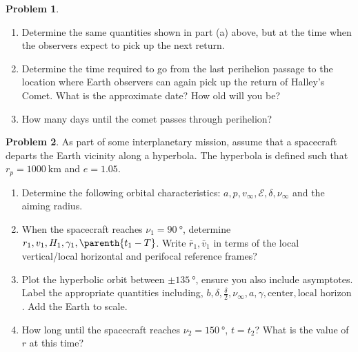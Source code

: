 \documentclass[10pt]{article}
\theoremstyle{definition}
\newtheorem{prob}{Problem}[section]
\newenvironment{subprob}%
{\renewcommand{\theenumi}{\alph{enumi}}\renewcommand{\labelenumi}{(\theenumi)}\begin{enumerate}}%
{\end{enumerate}}%
\begin{document}
\begin{prob}
\begin{subprob}
    \item Determine the same quantities shown in part (a) above, but at the time when the observers expect to pick up the next return.
    \item Determine the time required to go from the last perihelion passage to the location where Earth observers can again pick up the return of Halley's Comet.
        What is the approximate date?
        How old will you be?
    \item How many days until the comet passes through perihelion?
    \end{subprob}
\end{prob}

\clearpage\newpage
\begin{prob}
    As part of some interplanetary mission, assume that a spacecraft departs the Earth vicinity along a hyperbola.
    The hyperbola is defined such that \( r_p = \SI{1000}{\kilo\meter} \) and \( e  = 1.05\).

    \begin{subprob}
        \item Determine the following orbital characteristics: \( a, p, v_\infty, \mathcal{E}, \delta, \nu_\infty \) and the aiming radius.
        \item When the spacecraft reaches \( \nu_1 = \SI{90}{\degree} \), determine \( r_1, v_1, H_1, \gamma_1, \parenth{t_1 - T } \).
            Write \( \bar r_1, \bar v_1 \) in terms of the local vertical/local horizontal and perifocal reference frames?
        \item Plot the hyperbolic orbit between \( \pm \SI{135}{\degree} \), ensure you also include asymptotes.
            Label the appropriate quantities including, \( b, \delta, \frac{\delta}{2} , \nu_\infty, a, \gamma, \text{center} , \text{local horizon} \).
            Add the Earth to scale.
        \item How long until the spacecraft reaches \( \nu_2 = \SI{150}{\degree} \), \( t = t_2\)?
            What is the value of \( r \) at this time?
    \end{subprob}
\end{prob}
\end{document}
